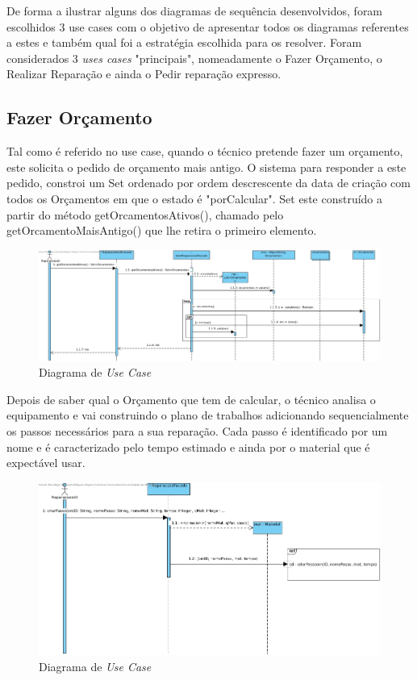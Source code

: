\documentclass[../relatorio.tex]{subfiles}
\begin{document}
De forma a ilustrar alguns dos diagramas de sequência desenvolvidos, foram escolhidos 3 use cases com o objetivo de 
apresentar todos os diagramas referentes a estes e também qual foi a estratégia escolhida para os resolver.
Foram considerados 3 \textit{uses cases} "principais", nomeadamente o Fazer Orçamento, o Realizar Reparação e ainda o
Pedir reparação expresso.

\subsection{Fazer Orçamento}
Tal como é referido no use case, quando o técnico pretende fazer um orçamento, este solicita o pedido de orçamento mais 
antigo. O sistema para responder a este pedido, constroi um Set ordenado por ordem descrescente da data de criação com todos os Orçamentos 
em que o estado é "porCalcular". Set este construído a partir do método getOrcamentosAtivos(), chamado pelo getOrcamentoMaisAntigo() que lhe retira
o primeiro elemento.
\begin{figure}[!ht]
    \centering
    \includegraphics[scale=0.45]{../assets/diagramas_sequencia/sd-GetOrcamentosAtivos.jpg}
    \caption{Diagrama de \textit{Use Case}}
\end{figure}

Depois de saber qual o Orçamento que tem de calcular, o técnico analisa o equipamento e vai construindo o plano de trabalhos adicionando 
sequencialmente os passos necessários para a sua reparação. Cada passo é identificado por um nome e é caracterizado pelo tempo estimado e ainda
por o material que é expectável usar.

\begin{figure}[!ht]
    \centering
    \includegraphics[scale=0.45]{../assets/diagramas_sequencia/sd-criarPasso1.jpg}
    \caption{Diagrama de \textit{Use Case}}
\end{figure}
\end{document}
